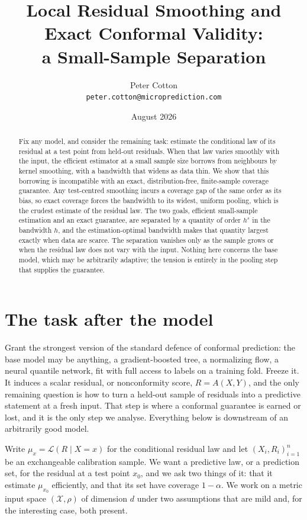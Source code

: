 \documentclass[11pt]{article}
\title{Local Residual Smoothing and Exact Conformal Validity:\\
a Small-Sample Separation}
\author{Peter Cotton\\\texttt{peter.cotton@microprediction.com}}
\date{August 2026}
\theoremstyle{definition}
\theoremstyle{remark}
\newcommand{\cX}{\mathcal{X}}
\begin{document}
\maketitle

\begin{abstract}
Fix any model, and consider the remaining task: estimate the conditional law of its
residual at a test point from held-out residuals. When that law varies smoothly with
the input, the efficient estimator at a small sample size borrows from neighbours by
kernel smoothing, with a bandwidth that widens as data thin. We show that this
borrowing is incompatible with an exact, distribution-free, finite-sample coverage
guarantee. Any test-centred smoothing incurs a coverage gap of the same order as its
bias, so exact coverage forces the bandwidth to its widest, uniform pooling, which is
the crudest estimate of the residual law. The two goals, efficient small-sample
estimation and an exact guarantee, are separated by a quantity of order $h^{s}$ in the
bandwidth $h$, and the estimation-optimal bandwidth makes that quantity largest exactly
when data are scarce. The separation vanishes only as the sample grows or when the
residual law does not vary with the input. Nothing here concerns the base model, which
may be arbitrarily adaptive; the tension is entirely in the pooling step that supplies
the guarantee.
\end{abstract}

\section{The task after the model}

Grant the strongest version of the standard defence of conformal prediction: the base
model may be anything, a gradient-boosted tree, a normalizing flow, a neural quantile
network, fit with full access to labels on a training fold. Freeze it. It induces a
scalar residual, or nonconformity score, $R = A(X,Y)$, and the only remaining question
is how to turn a held-out sample of residuals into a predictive statement at a fresh
input. That step is where a conformal guarantee is earned or lost, and it is the only
step we analyse. Everything below is downstream of an arbitrarily good model.

Write $\mu_x = \mathcal{L}(R \mid X = x)$ for the conditional residual law and let
$(X_i, R_i)_{i=1}^{n}$ be an exchangeable calibration sample. We want a predictive law,
or a prediction set, for the residual at a test point $x_0$, and we ask two things of
it: that it estimate $\mu_{x_0}$ efficiently, and that its set have coverage
$1-\alpha$. We work on a metric input space $(\cX,\rho)$ of dimension $d$ under two
assumptions that are mild and, for the interesting case, both present.
\end{document}
